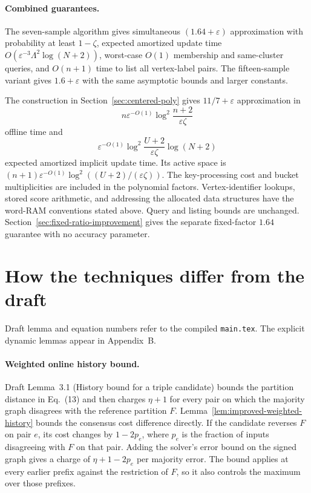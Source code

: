 \documentclass[11pt]{article}
\begin{document}
\paragraph{Combined guarantees.}
The seven-sample algorithm gives simultaneous
$(1.64+\varepsilon)$ approximation with probability at least
$1-\zeta$, expected amortized update time
$O(\varepsilon^{-3}\Lambda^2\log(N+2))$, worst-case $O(1)$ membership
and same-cluster queries, and $O(n+1)$ time to list all vertex-label
pairs. The fifteen-sample variant gives $1.6+\varepsilon$ with the
same asymptotic bounds and larger constants.

The construction in Section~\ref{sec:centered-poly} gives
$11/7+\varepsilon$ approximation in
\[
 n\varepsilon^{-O(1)}\log^2\frac{n+2}{\varepsilon\zeta}
\]
offline time and
\[
 \varepsilon^{-O(1)}\log^2\frac{U+2}{\varepsilon\zeta}\log(N+2)
\]
expected amortized implicit update time. Its active space is
$(n+1)\varepsilon^{-O(1)}\log^2((U+2)/(\varepsilon\zeta))$.
The key-processing cost and bucket multiplicities are included in
the polynomial factors. Vertex-identifier lookups, stored score
arithmetic, and addressing the allocated data structures have the
word-RAM conventions stated above. Query and listing bounds are
unchanged. Section~\ref{sec:fixed-ratio-improvement} gives the
separate fixed-factor $1.64$ guarantee with no accuracy parameter.

\section{How the techniques differ from the draft}
\label{sec:technique-comparison}

Draft lemma and equation numbers refer to the compiled \texttt{main.tex}.
The explicit dynamic lemmas appear in Appendix~B.

\paragraph{Weighted online history bound.}
Draft Lemma~3.1 (History bound for a triple candidate) bounds the
partition distance in Eq.~(13) and then charges $\eta+1$ for every pair
on which the majority graph disagrees with the reference partition $F$.
Lemma~\ref{lem:improved-weighted-history} bounds the consensus cost
difference directly. If the candidate reverses $F$ on pair $e$, its cost
changes by $1-2p_e$, where $p_e$ is the fraction of inputs disagreeing
with $F$ on that pair. Adding the solver's error bound on the signed
graph gives a charge of $\eta+1-2p_e$ per majority error. The bound
applies at every earlier prefix against the restriction of $F$, so it
also controls the maximum over those prefixes.
\end{document}
